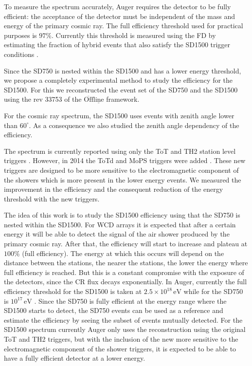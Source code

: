 \documentclass[12pt,a4paper]{article}
\newcommand{\eV}{\, \mathrm{eV}}
\begin{document}
To measure the spectrum accurately, Auger requires the detector to be fully efficient: the acceptance of the detector must be independent of the mass and energy of the primary cosmic ray. The full efficiency threshold used for practical purposes is $97\%$.
Currently this threshold is measured using the FD by estimating the fraction of hybrid events that also satisfy the SD1500 trigger conditions \cite{Trigger}\cite{VerticalSpectrum}.

Since the SD750 is nested within the SD1500 and has a lower energy threshold, we propose a completely experimental method to study the efficiency for the SD1500. For this we reconstructed the event set of the SD750 and the SD1500 using the rev 33753 of the $\mathrm{\overline{Off}\underline{line}}$ framework. 

For the cosmic ray spectrum, the SD1500 uses events with zenith angle lower than $60^{\circ}$. As a consequence we also studied the zenith angle dependency of the efficiency.

The spectrum is currently reported using only the ToT and TH2 station level triggers \cite{Trigger}. However, in 2014 the ToTd and MoPS triggers were added \cite{Coleman}. These new triggers are designed to be more sensitive to the electromagnetic component of the showers which is more present in the lower energy events. We measured the improvement in the efficiency and the consequent reduction of the energy threshold with the new triggers.

The idea of this work is to study the SD1500 efficiency using that the SD750 is nested within the SD1500. For WCD arrays it is expected that after a certain energy it will be able to detect the signal of the air shower produced by the primary cosmic ray. After that, the efficiency will start to increase and plateau at $100\%$ (full efficiency). The energy at which this occurs will depend on the distance between the stations, the nearer the stations, the lower the energy where full efficiency is reached. But this is a constant compromise with the exposure of the detectors, since the CR flux decays exponentially. In Auger, currently the full efficiency threshold for the SD1500 is taken at $2.5\times10^{18}\eV$ while for the SD750 is $10^{17}\eV$ \cite{SD750Spectrum}. Since the SD750 is fully efficient at the energy range where the SD1500 starts to detect, the SD750 events can be used as a reference and estimate the efficiency by seeing the subset of events mutually detected. For the SD1500 spectrum currently Auger only uses the reconstruction using the original ToT and TH2 triggers, but with the inclusion of the new more sensitive to the electromagnetic component of the shower triggers, it is expected to be able to have a fully efficient detector at a lower energy. 
\end{document}
